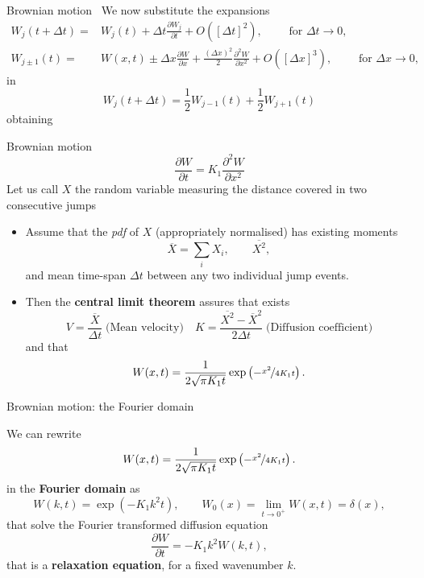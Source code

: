 \documentclass[aspectratio=169,xcolor=dvipsnames]{beamer}
\begin{document}
\begin{frame}{Brownian motion~\parencite{MR1809268}}
We now substitute the expansions
\[
\begin{split}
W_j(t+\Delta t) = & W_j(t) + \Delta t \frac{\partial W_j}{\partial t} + O([\Delta t]^2), \qquad \text{ for } \Delta t \rightarrow 0,\\
W_{j\pm1}(t) = & W(x,t) \pm \Delta x \frac{\partial W}{\partial x} + \frac{(\Delta x)^2}{2} \frac{\partial^2 W}{\partial x^2} + O([\Delta x]^3) , \qquad \text{ for } \Delta x \rightarrow 0,
\end{split}
\]	
in
\[
W_{j}(t+\Delta t) = \frac{1}{2} W_{j-1}(t) + \frac{1}{2}W_{j+1}(t)
\]
obtaining
\end{frame}

\begin{frame}{Brownian motion}
\[
\frac{\partial W}{\partial t} = K_1 \frac{\partial^2 W}{\partial x^2}
\]
Let us call $X$ the random variable measuring the distance covered in two consecutive jumps
\begin{itemize}
	\item Assume that the \emph{pdf} of $X$ (appropriately normalised) has existing moments
	\[
	\overline{X} = \sum_{i} X_i, \qquad \overline{X^2},
	\]
	and mean time-span $\Delta t$ between any two individual jump events.
	\item<2-> Then the \textbf{central limit theorem} assures that exists
	\[
	V = \frac{\overline{X}}{\Delta t}\;\text{(Mean velocity)}\quad K = \frac{\overline{X^2}-\overline{X}^2}{2\Delta t}\;\text{(Diffusion coefficient)}
	\]
	and that
	\[
	W(x,t) = \frac{1}{2\sqrt{\pi K_1 t}} \exp\left(- \nicefrac{x^2}{4K_1 t}\right).
	\]
\end{itemize}
\end{frame}

\begin{frame}{Brownian motion: the Fourier domain}

We can rewrite
\[
W(x,t) = \frac{1}{2\sqrt{\pi K_1 t}} \exp\left(- \nicefrac{x^2}{4K_1 t}\right).
\]
in the \textbf{Fourier domain} as
\[
W(k,t) = \exp(-K_1 k^2 t), \qquad W_0(x) = \lim_{t\rightarrow0^+} W(x,t) = \delta(x),
\]
that solve the \alert{Fourier transformed diffusion equation}
\[
\frac{\partial W}{\partial t} = - K_1 k^2 W(k,t),
\]
that is a \textbf{relaxation equation}, for a fixed wavenumber $k$.
\end{frame}
\end{document}
